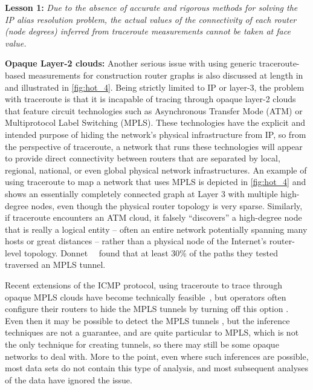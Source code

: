\clearpage
{\bf Lesson 1:} {\em Due to the absence of accurate and rigorous methods for solving the IP alias
resolution problem, the actual values of the connectivity of each router (\ie node degrees)
inferred from traceroute measurements cannot be taken at face
value.}

{\bf Opaque Layer-2 clouds:} Another serious issue with
using generic traceroute-based measurements for construction router
graphs is also discussed at length in \cite{pansiot98:_inter} and
illustrated in \autoref{fig:hot_4}.  Being strictly limited to IP or
layer-3, the problem with traceroute is that it is incapable of
tracing through opaque layer-2 clouds that feature circuit
technologies such as Asynchronous Transfer Mode (ATM) or Multiprotocol
Label Switching (MPLS). These technologies have the explicit and
intended purpose of hiding the network's physical infrastructure from
IP, so from the perspective of traceroute, a network that runs these
technologies will appear to provide direct connectivity between
routers that are separated by local, regional, national, or even
global physical network infrastructures. An example of using
traceroute to map a network that uses MPLS is depicted in
\autoref{fig:hot_4} and shows an essentially completely connected
graph at Layer 3 with multiple high-degree nodes, even though the
physical router topology is very sparse. Similarly, if traceroute
encounters an ATM cloud, it falsely ``discovers'' a high-degree node
that is really a logical entity -- often an entire network potentially
spanning many hosts or great distances -- rather than a physical node
of the Internet's router-level
topology. Donnet~\etal~\cite{benoit12:_reveal_mpls} found that at
least 30\% of the paths they tested traversed an MPLS tunnel.

Recent extensions of the ICMP protocol, using traceroute to trace
through opaque MPLS clouds have become technically
feasible~\cite{rfc4950}, but operators often configure their routers to
hide the MPLS tunnels by turning off this option
\cite{sommers11:_preval_charac_mpls_deploy_open_inter}. Even then it
may be possible to detect the MPLS tunnels
\cite{benoit12:_reveal_mpls}, but the inference techniques are not a
guarantee, and are quite particular to MPLS, which is not the only
technique for creating tunnels, so there may still be some opaque
networks to deal with.  More to the point, even where such inferences
are possible, most data sets do not contain this type of analysis, and
most subsequent analyses of the data have ignored the issue.


